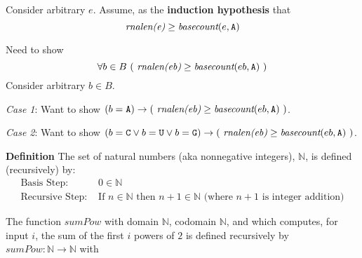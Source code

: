 \documentclass[12pt, oneside]{article}
\begin{document}
Consider arbitrary $e$. Assume, as the {\bf induction hypothesis} that 
\[
\textit{rnalen(e)} \geq \textit{basecount}(e, \texttt{A})
\]

Need to show 
\[
 \forall b \in B ~(~\textit{rnalen(eb)} \geq \textit{basecount}(eb, \texttt{A})~) 
\]
Consider arbitrary $b \in B$. 


{\it Case 1}: Want to show $(b = \texttt{A}) \to (~\textit{rnalen(eb)} \geq \textit{basecount}(eb, \texttt{A})~) $.

\vfill

{\it Case 2}: Want to show $(b = \texttt{C} \lor b = \texttt{U} \lor b = \texttt{G}) \to (~\textit{rnalen(eb)} \geq \textit{basecount}(eb, \texttt{A})~) $.

\vfill
\vfill


\newpage



{\bf Definition} The set of natural numbers (aka nonnegative integers), $\mathbb{N}$, is defined (recursively) by:
\[
\begin{array}{ll}
\textrm{Basis Step: } & 0 \in \mathbb{N} \\
\textrm{Recursive Step: } & \textrm{If } n \in \mathbb{N} \textrm{ then } n+1 \in \mathbb{N} \textrm{ (where $n+1$ is integer addition)}
\end{array}
\]

The function $sumPow$ with domain $\mathbb{N}$, codomain
$\mathbb{N}$, and which computes, for input $i$, the sum of the first $i$ powers of $2$ is defined
recursively by $sumPow: \mathbb{N} \to \mathbb{N}$ with

\vspace{-20pt}
\end{document}
